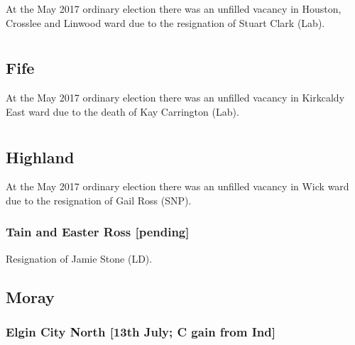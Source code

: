 \documentclass[a4paper,openany]{book}
\begin{document}
\begin{resultsiii}
At the May 2017 ordinary election there was an unfilled vacancy in Houston, Crosslee and Linwood ward due to the resignation of Stuart Clark (Lab).

\section[Forth Councils]{}

\subsection*{Fife}

At the May 2017 ordinary election there was an unfilled vacancy in Kirkcaldy East ward due to the death of Kay Carrington (Lab).

\section[Highland Councils]{}

\subsection*{Highland}

At the May 2017 ordinary election there was an unfilled vacancy in Wick ward due to the resignation of Gail Ross (SNP).

\subsubsection*{Tain and Easter Ross \hspace*{\fill}\nolinebreak[1]%
\enspace\hspace*{\fill}
[pending]}


Resignation of Jamie Stone (LD).

\subsection*{Moray}

\subsubsection*{Elgin City North \hspace*{\fill}\nolinebreak[1]%
\enspace\hspace*{\fill}
[13th July; C gain from Ind]}


\end{resultsiii}
\end{document}
